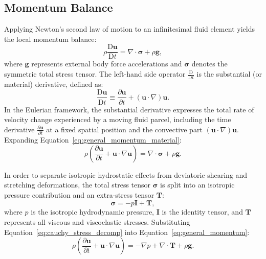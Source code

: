 \subsection{Momentum Balance}
\label{subsec:general_momentum}
Applying Newton's second law of motion to an infinitesimal fluid element yields the local momentum balance:
\begin{equation}
    \rho \frac{\mathrm{D}\boldsymbol{u}}{\mathrm{D}t} = \nabla \cdot \boldsymbol{\sigma} + \rho \boldsymbol{g} ,
    \label{eq:general_momentum_material}
\end{equation}
where $\boldsymbol{g}$ represents external body force accelerations and $\boldsymbol{\sigma}$ denotes the symmetric total stress tensor.
The left-hand side operator $\frac{\mathrm{D}}{\mathrm{D}t}$ is the substantial (or material) derivative, defined as:
\begin{equation}
    \frac{\mathrm{D}\boldsymbol{u}}{\mathrm{D}t} \equiv \frac{\partial \boldsymbol{u}}{\partial t} + (\boldsymbol{u} \cdot \nabla) \boldsymbol{u} .
    \label{eq:substantial_derivative_definition}
\end{equation}
In the Eulerian framework, the substantial derivative expresses the total rate of velocity change experienced by a moving fluid parcel,
including the time derivative $\frac{\partial \boldsymbol{u}}{\partial t}$ at a fixed spatial position
and the convective part $(\boldsymbol{u} \cdot \nabla)\boldsymbol{u}$.
Expanding Equation~\eqref{eq:general_momentum_material}:
\begin{equation}
    \rho \left( \frac{\partial \boldsymbol{u}}{\partial t} + \boldsymbol{u} \cdot \nabla \boldsymbol{u} \right) = \nabla \cdot \boldsymbol{\sigma} + \rho \boldsymbol{g} .
    \label{eq:general_momentum}
\end{equation}

In order to separate isotropic hydrostatic effects from deviatoric shearing and stretching deformations,
the total stress tensor $\boldsymbol{\sigma}$ is split into an isotropic pressure contribution and an extra-stress tensor $\boldsymbol{T}$:
\begin{equation}
    \boldsymbol{\sigma} = -p \boldsymbol{I} + \boldsymbol{T} ,
    \label{eq:cauchy_stress_decomp}
\end{equation}
where $p$ is the isotropic hydrodynamic pressure, $\boldsymbol{I}$ is the identity tensor,
and $\boldsymbol{T}$ represents all viscous and viscoelastic stresses.
Substituting Equation~\eqref{eq:cauchy_stress_decomp} into Equation~\eqref{eq:general_momentum}:
\begin{equation}
    \rho \left( \frac{\partial \boldsymbol{u}}{\partial t} + \boldsymbol{u} \cdot \nabla \boldsymbol{u} \right) = -\nabla p + \nabla \cdot \boldsymbol{T} + \rho \boldsymbol{g} .
    \label{eq:general_momentum_expanded}
\end{equation}

